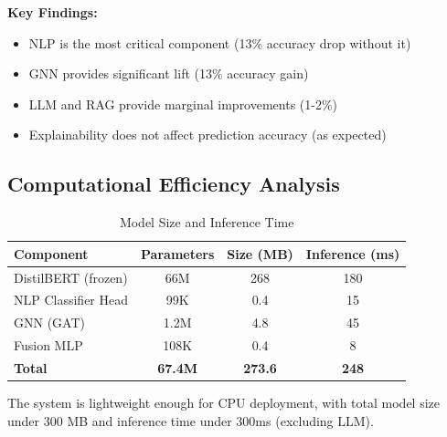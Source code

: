 \textbf{Key Findings:}
\begin{itemize}
    \item NLP is the most critical component (13\% accuracy drop without it)
    \item GNN provides significant lift (13\% accuracy gain)
    \item LLM and RAG provide marginal improvements (1-2\%)
    \item Explainability does not affect prediction accuracy (as expected)
\end{itemize}

\subsection{Computational Efficiency Analysis}

\begin{table}[h]
\centering
\caption{Model Size and Inference Time}
\label{tab:efficiency}
\begin{tabular}{lccc}
\toprule
\textbf{Component} & \textbf{Parameters} & \textbf{Size (MB)} & \textbf{Inference (ms)} \\
\midrule
DistilBERT (frozen) & 66M & 268 & 180 \\
NLP Classifier Head & 99K & 0.4 & 15 \\
GNN (GAT) & 1.2M & 4.8 & 45 \\
Fusion MLP & 108K & 0.4 & 8 \\
\midrule
\textbf{Total} & \textbf{67.4M} & \textbf{273.6} & \textbf{248} \\
\bottomrule
\end{tabular}
\end{table}

The system is lightweight enough for CPU deployment, with total model size under 300 MB and inference time under 300ms (excluding LLM).
